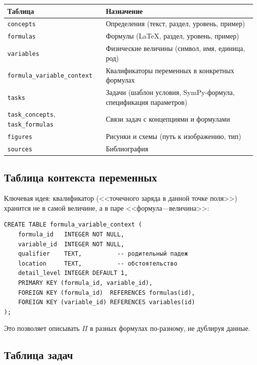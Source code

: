 \documentclass[12pt,a4paper]{article}
\newcommand{\code}[1]{\texttt{#1}}
\begin{document}
\begin{center}
\begin{tabular}{@{}p{3.5cm}p{9.5cm}@{}}
\toprule
\textbf{Таблица} & \textbf{Назначение} \\
\midrule
\code{concepts} & Определения (текст, раздел, уровень, пример) \\
\code{formulas} & Формулы (LaTeX, раздел, уровень, пример) \\
\code{variables} & Физические величины (символ, имя, единица, род) \\
\code{formula\_variable\_context} & Квалификаторы переменных в конкретных формулах \\
\code{tasks} & Задачи (шаблон условия, SymPy-формула, спецификация параметров) \\
\code{task\_concepts}, \code{task\_formulas} & Связи задач с концепциями и формулами \\
\code{figures} & Рисунки и схемы (путь к изображению, тип) \\
\code{sources} & Библиография \\
\bottomrule
\end{tabular}
\end{center}

\subsection{Таблица контекста переменных}

Ключевая идея: квалификатор (<<точечного заряда в данной точке поля>>)
хранится не в самой величине, а в паре <<формула---величина>>:

\begin{verbatim}
CREATE TABLE formula_variable_context (
    formula_id   INTEGER NOT NULL,
    variable_id  INTEGER NOT NULL,
    qualifier    TEXT,          -- родительный падеж
    location     TEXT,          -- обстоятельство
    detail_level INTEGER DEFAULT 1,
    PRIMARY KEY (formula_id, variable_id),
    FOREIGN KEY (formula_id)  REFERENCES formulas(id),
    FOREIGN KEY (variable_id) REFERENCES variables(id)
);
\end{verbatim}

\noindent
Это позволяет описывать \(\Pi\) в разных формулах по-разному,
не дублируя данные.

\subsection{Таблица задач}
\end{document}
